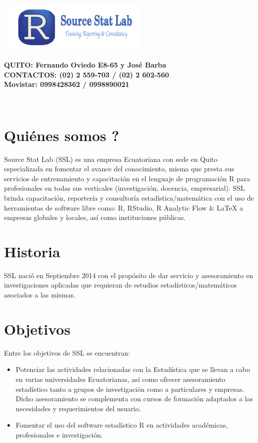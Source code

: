 \documentclass[12pt,a4paper,oneside]{article}\usepackage[]{graphicx}\usepackage[]{color}
\begin{document}
\begin{minipage}[d]{115mm}
\includegraphics[height=2.5cm, width=7.5cm]{logo_ult.pdf}
\end{minipage}
\begin{minipage}[d]{70mm}
\textsf{\textbf{\sc \tiny {\bf QUITO}: Fernando Oviedo E8-65 y José Barba}}\\
\textsf{\textbf{\sc \tiny {\bf CONTACTOS}: (02) 2 559-703 / (02) 2 602-560\\ Movistar: 0998428362 / 0998890021}}
\end{minipage}\\
\vspace{0.4cm}

\section{Quiénes somos ?}

Source Stat Lab (SSL) es una empresa Ecuatoriana con sede en Quito especializada en fomentar el avance del conocimiento, misma que presta sus servicios de entrenamiento y capacitación en el lenguaje de programación R para profesionales en todas sus verticales (investigación, docencia, empresarial). SSL brinda capacitación, reportería y consultoría estadística/matemática con el uso de herramientas de software libre como: R, RStudio, R Analytic Flow $\&$ LaTeX a empresas globales y locales, así como instituciones públicas.

\section{Historia}

SSL nació en Septiembre 2014 con el propósito de dar servicio y asesoramiento en investigaciones aplicadas que requieran de estudios estadísticos/matemáticos asociados a las mismas.

\section{Objetivos}

Entre los objetivos de SSL se encuentran:
\begin{itemize}
  \item Potenciar las actividades relacionadas con la Estadística que se llevan a cabo en varias universidades Ecuatorianas, así como ofrecer asesoramiento estadístico tanto a grupos de investigación como a particulares y empresas.  Dicho asesoramiento se complementa con cursos de formación adaptados a las necesidades y requerimientos del usuario.
  \item Fomentar el uso del software estadístico R en actividades académicas, profesionales e investigación.  
\end{itemize}
 
\end{document}
